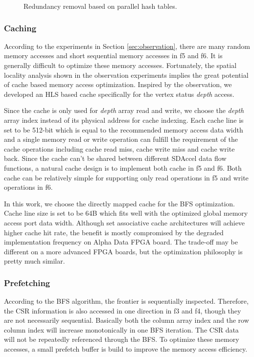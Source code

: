 \begin{figure}
    \caption{Redundancy removal based on parallel hash tables.}
\label{fig:hash-strategy}
\end{figure}

\subsubsection{Caching}
According to the experiments in Section \ref{sec:observation}, 
there are many random memory accesses and short 
sequential memory accesses in f5 and f6. 
It is generally difficult to optimize these memory accesses. Fortunately, 
the spatial locality analysis shown in the observation experiments 
implies the great potential of cache based memory access optimization. 
Inspired by the observation, we developed an HLS based cache specifically 
for the vertex status \textit{depth} access. 

Since the cache is only used for \textit{depth} array read and write, we  
choose the \textit{depth} array index instead of its physical address for cache 
indexing. Each cache line is set to be 512-bit which is equal to the recommended 
memory access data width and a single memory read or write operation can 
fulfill the requirement of the cache operations including cache read miss, 
cache write miss and cache write back. Since the cache can't be shared 
between different SDAccel data flow functions, a natural cache design is 
to implement both cache in f5 and f6. Both cache can be relatively simple 
for supporting only read operations in f5 and write operations in f6.  

In this work, we choose the directly mapped cache for the BFS optimization. 
Cache line size is set to be 64B which fits well with the optimized global memory 
access port data width.
Although set associative cache architectures will achieve higher 
cache hit rate, the benefit is mostly compromised by the degraded 
implementation frequency on Alpha Data FPGA board. The trade-off 
may be different on a more advanced FPGA boards, but the optimization 
philosophy is pretty much similar. 
 
\subsubsection{Prefetching}
According to the BFS algorithm, the frontier is sequentially inspected. 
Therefore, the CSR information is also accessed in one direction 
in f3 and f4, though they are not necessarily sequential. Basically 
both the column array index and the row column index will increase 
monotonically in one BFS iteration. The CSR data will not be repeatedly 
referenced through the BFS. To optimize these memory 
accesses, a small prefetch buffer 
is build to improve the memory access efficiency. 


